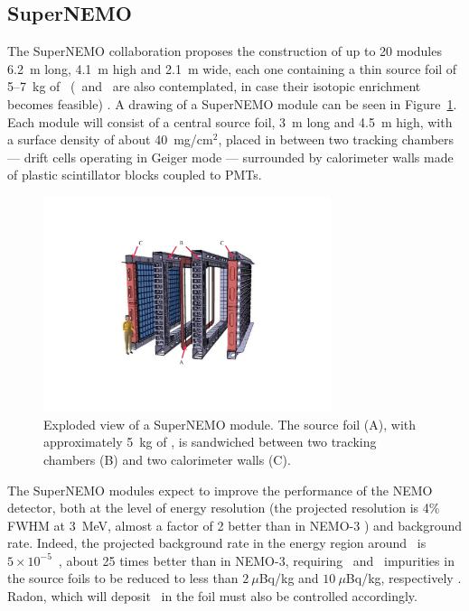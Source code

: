 \documentclass{PoS}
\begin{document}
\subsection{SuperNEMO} \label{subsec:SuperNEMO}
The SuperNEMO collaboration proposes the construction of up to 20 modules 6.2~m long, 4.1~m high and 2.1~m wide, each one containing a thin source foil of 5--7~kg of \SE\ (\ND\ and \CA\ are also contemplated, in case their isotopic enrichment becomes feasible) \cite{Lang:2013fta}. A drawing of a SuperNEMO module can be seen in Figure~\ref{fig:SuperNEMO}. Each module will consist of a central source foil, 3~m long and 4.5~m high, with a surface density of about 40~mg/cm$^{2}$, placed in between two tracking chambers --- drift cells operating in Geiger mode --- surrounded by calorimeter walls made of plastic scintillator blocks coupled to PMTs.

\begin{figure}
\centering
\includegraphics[trim=220 155 220 155, clip, width=0.75\textwidth]{img/SuperNEMO.pdf}
\caption{Exploded view of a SuperNEMO module. The source foil (A), with approximately 5~kg of \SE, is sandwiched between two tracking chambers (B) and two calorimeter walls (C).} \label{fig:SuperNEMO}
\end{figure}

The SuperNEMO modules expect to improve the performance of the NEMO detector, both at the level of energy resolution (the projected resolution is 4\% FWHM at 3~MeV, almost a factor of 2 better than in NEMO-3 \cite{Bongrand:2014nu}) and background rate. Indeed, the 
projected background rate in the energy region around \Qbb\ is $5\times10^{-5}$~\ckky, about 25 times better than in NEMO-3, requiring \BI\ and \TL\ impurities in the source foils to be reduced to less than $2~\mu$Bq/kg and $10~\mu$Bq/kg, respectively \cite{Bongrand:2014nu}. Radon, which will deposit \BI\ in the foil must also be controlled accordingly. 
\end{document}
